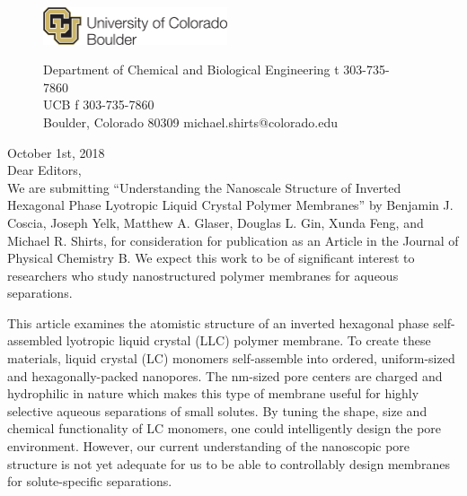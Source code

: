 \documentclass[fontsize=11pt]{article}
\begin{document}
	\graphicspath{{./figures/}}

	\begin{figure}
	\centering
	\begin{minipage}{0.37\textwidth}
	\includegraphics[width=2.14in,left]{CUBoulder.pdf}
	\end{minipage}
	\begin{minipage}{0.62\textwidth}
	\scriptsize
	\noindent Department of Chemical and Biological Engineering \hfill t 303-735-7860~~~~~~~~~~~~~~~~~~ \\
	 UCB \hfill f 303-735-7860~~~~~~~~~~~~~~~~~~ \\
	\noindent Boulder, Colorado 80309 \hfill michael.shirts@colorado.edu \\
	\end{minipage}
	\end{figure}
	
	\noindent October 1st, 2018\\

	\noindent Dear Editors,\\
	
	We are submitting ``Understanding the Nanoscale Structure of Inverted Hexagonal 
	Phase Lyotropic Liquid Crystal Polymer Membranes'' by Benjamin J. Coscia, Joseph
	Yelk, Matthew A. Glaser, Douglas L. Gin, Xunda Feng, and Michael R. Shirts, for
	consideration for publication as an Article in the Journal of Physical Chemistry
	B. We expect this work to be of significant interest to researchers who study 
	nanostructured polymer membranes for aqueous separations.
	
	This article examines the atomistic structure of an inverted hexagonal phase 
	self-assembled lyotropic liquid crystal (LLC) polymer membrane. To create these
	materials, liquid crystal (LC) monomers self-assemble into ordered, uniform-sized
	and hexagonally-packed nanopores. The nm-sized pore centers are charged and hydrophilic 
	in nature which makes this type of membrane useful for highly selective aqueous 
	separations of small solutes. By tuning the shape, size and chemical functionality
	of LC monomers, one could intelligently design the pore environment. However, our 
	current understanding of the nanoscopic pore structure is not yet adequate for us to
	be able to controllably design membranes for solute-specific separations.
	
\end{document}
